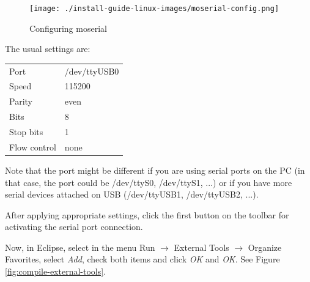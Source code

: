 \documentclass[a4paper, 10pt]{article}
\begin{document}
    \begin{figure}[H]
    \centering
        \texttt{[image: ./install-guide-linux-images/moserial-config.png]}
        \caption{Configuring moserial}
        \label{fig:moserial-config}
    \end{figure}


The usual settings are:

    \smallskip
    \begin{tabular}{ l l }
    Port         & /dev/ttyUSB0 \\
    Speed        & 115200       \\
    Parity       & even         \\
    Bits         & 8            \\
    Stop bits    & 1            \\
    Flow control & none         \\
    \end{tabular}
    \smallskip

Note that the port might be different if you are using serial ports on the PC
(in that case, the port could be /dev/ttyS0, /dev/ttyS1, ...)
or if you have more serial devices attached on USB (/dev/ttyUSB1, /dev/ttyUSB2, ...).

After applying appropriate settings, click the first button on the toolbar for
activating the serial port connection.

Now, in Eclipse, select
in the menu
Run $\rightarrow$ External Tools $\rightarrow$ Organize Favorites,
select \emph{Add}, check both items and click \emph{OK} and \emph{OK}.
See Figure \ref{fig:compile-external-tools}.
\end{document}
